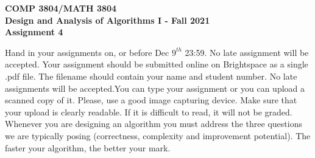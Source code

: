 \documentclass[12pt]{article}
\newcounter{ques}
\begin{document}
\begin{center} \large\bf
COMP 3804/MATH 3804\\
Design and Analysis of Algorithms I  -
Fall  2021\\
Assignment 4
\end{center}

Hand in your assignments on, or before
Dec $9^{th}$ 23:59. No late assignment will be accepted. Your assignment should be submitted online on Brightspace as a single .pdf file.  The filename should contain your name and student number. No late assignments will be accepted.You can type your assignment or you can upload a scanned copy of it.  Please, use a good image capturing device. Make sure that your upload is clearly readable. If it is difficult to read, it will not be graded. Whenever you are designing an algorithm you must address the three questions we are
typically posing (correctness, complexity and improvement potential).
The faster your
algorithm, the better your mark.     \\

\vspace{1em}
\end{document}
